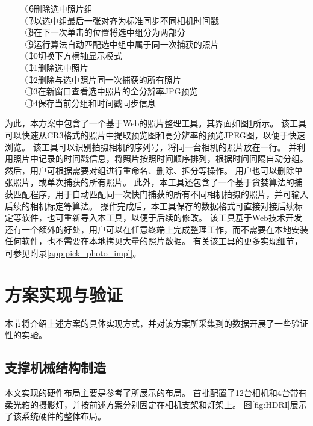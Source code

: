 \begin{figure}
{\textcircled{6}删除选中照片组\\
\textcircled{7}以选中组最后一张对齐为标准同步不同相机时间戳\\
\textcircled{8}在下一次单击的位置将选中组分为两部分\\
\textcircled{9}运行算法自动匹配选中组中属于同一次捕获的照片\\
\textcircled{10}切换下方横轴显示模式\\
\textcircled{11}删除选中照片\\
\textcircled{12}删除与选中照片同一次捕获的所有照片\\
\textcircled{13}在新窗口查看选中照片的全分辨率JPG预览\\
\textcircled{14}保存当前分组和时间戳同步信息
}
\label{fig:pick_photo}
\end{figure}
为此，本方案中包含了一个基于Web的照片整理工具。其界面如图\ref{fig:pick_photo}所示。
该工具可以快速从CR3格式的照片中提取预览图和高分辨率的预览JPEG图，以便于快速浏览。
该工具可以识别拍摄相机的序列号，将同一台相机的照片放在一行。
并利用照片中记录的时间戳信息，将照片按照时间顺序排列，根据时间间隔自动分组。
然后，用户可根据需要对组进行重命名、删除、拆分等操作。
用户也可以删除单张照片，或单次捕获的所有照片。
此外，本工具还包含了一个基于贪婪算法的捕获匹配程序，用于自动匹配同一次快门捕获的所有不同相机拍摄的照片，并可输入后续的相机标定等算法。
操作完成后，本工具保存的数据格式可直接对接后续标定等软件，也可重新导入本工具，以便于后续的修改。
该工具基于Web技术开发还有一个额外的好处，用户可以在任意终端上完成整理工作，而不需要在本地安装任何软件，也不需要在本地拷贝大量的照片数据。
有关该工具的更多实现细节，可参见附录\ref{app:pick_photo_impl}。

\section{方案实现与验证}

本节将介绍上述方案的具体实现方式，并对该方案所采集到的数据开展了一些验证性的实验。

\subsection{支撑机械结构制造}

本文实现的硬件布局主要是参考了\citet{RiviereGBGB20}所展示的布局。
首批配置了12台相机和4台带有柔光箱的摄影灯，并按前述方案分别固定在相机支架和灯架上。
图\ref{fig:HDRI}展示了该系统硬件的整体布局。

